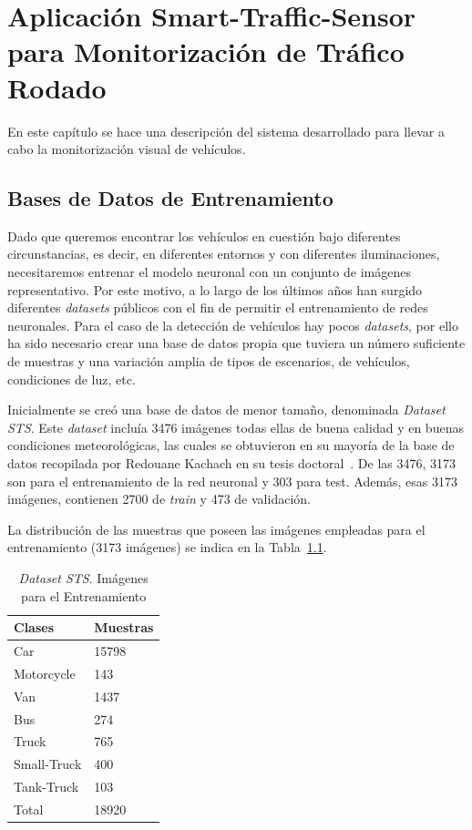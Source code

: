 \chapter{Aplicación Smart-Traffic-Sensor para Monitorización de Tráfico Rodado}\label{cap.diseno}

En este capítulo se hace una descripción del sistema desarrollado para llevar a cabo la monitorización visual de vehículos.

\section{Bases de Datos de Entrenamiento}\label{sec.base_datos}

Dado que queremos encontrar los vehículos en cuestión bajo diferentes circunstancias, es decir, en diferentes entornos y con diferentes iluminaciones, necesitaremos entrenar el modelo neuronal con un conjunto de imágenes representativo. Por este motivo, a lo largo de los últimos años han surgido diferentes \textit{datasets} públicos con el fin de permitir el entrenamiento de redes neuronales. Para el caso de la detección de vehículos hay pocos \textit{datasets}, por ello ha sido necesario crear una base de datos propia que tuviera un número suficiente de muestras y una variación amplia de tipos de escenarios, de vehículos, condiciones de luz, etc.

Inicialmente se creó una base de datos de menor tamaño, denominada \textit{Dataset STS}. Este \textit{dataset} incluía 3476 imágenes todas ellas de buena calidad y en buenas condiciones meteorológicas, las cuales se obtuvieron en su mayoría de la base de datos recopilada por Redouane Kachach en su tesis doctoral~\cite{traffic_monitor_lab}. De las 3476, 3173 son para el entrenamiento de la red neuronal y 303 para test. Además, esas 3173 imágenes, contienen 2700 de \textit{train} y 473 de validación.

La distribución de las muestras que poseen las imágenes empleadas para el entrenamiento (3173 imágenes) se indica en la Tabla~\ref{tabla_database}.

\begin{table}[H]
\begin{center}
\begin{tabular}{|l|l|}
\hline
Clases & Muestras \\
\hline \hline
Car & 15798 \\ \hline
Motorcycle & 143 \\ \hline
Van & 1437 \\ \hline
Bus & 274 \\ \hline
Truck & 765 \\ \hline
Small-Truck & 400 \\ \hline
Tank-Truck & 103 \\ \hline
Total & 18920 \\ \hline
\end{tabular}
\caption{\textit{Dataset STS}. Imágenes para el Entrenamiento}
\label{tabla_database}
\end{center}
\end{table}

